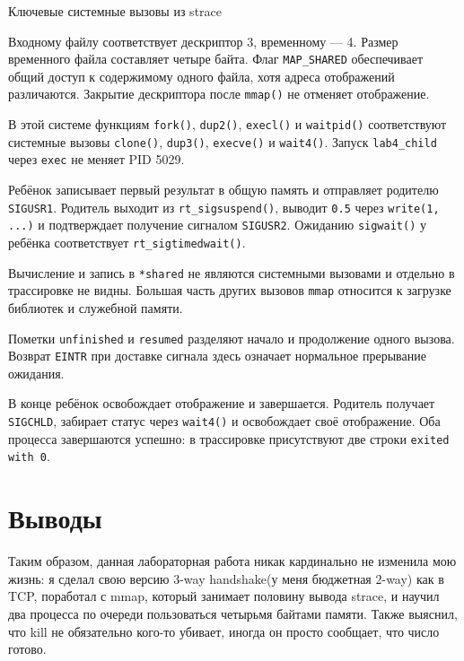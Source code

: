 \documentclass[12pt, a4paper]{article}
\begin{document}
\begin{listingblock}{Ключевые системные вызовы из strace}
\end{listingblock}

Входному файлу соответствует дескриптор 3, временному --- 4. Размер временного файла составляет четыре байта. Флаг \texttt{MAP\_SHARED} обеспечивает общий доступ к содержимому одного файла, хотя адреса отображений различаются. Закрытие дескриптора после \texttt{mmap()} не отменяет отображение.

В этой системе функциям \texttt{fork()}, \texttt{dup2()}, \texttt{execl()} и \texttt{waitpid()} соответствуют системные вызовы \texttt{clone()}, \texttt{dup3()}, \texttt{execve()} и \texttt{wait4()}. Запуск \texttt{lab4\_child} через \texttt{exec} не меняет PID 5029.

Ребёнок записывает первый результат в общую память и отправляет родителю \texttt{SIGUSR1}. Родитель выходит из \texttt{rt\_sigsuspend()}, выводит \texttt{0.5} через \texttt{write(1, ...)} и подтверждает получение сигналом \texttt{SIGUSR2}. Ожиданию \texttt{sigwait()} у ребёнка соответствует \texttt{rt\_sigtimedwait()}.

Вычисление и запись в \texttt{*shared} не являются системными вызовами и отдельно в трассировке не видны. Большая часть других вызовов \texttt{mmap} относится к загрузке библиотек и служебной памяти.

Пометки \texttt{unfinished} и \texttt{resumed} разделяют начало и продолжение одного вызова. Возврат \texttt{EINTR} при доставке сигнала здесь означает нормальное прерывание ожидания.

В конце ребёнок освобождает отображение и завершается. Родитель получает \texttt{SIGCHLD}, забирает статус через \texttt{wait4()} и освобождает своё отображение. Оба процесса завершаются успешно: в трассировке присутствуют две строки \texttt{exited with 0}.

\section{Выводы}

Таким образом, данная лабораторная работа никак кардинально не изменила мою жизнь: я сделал свою версию 3-way handshake(у меня бюджетная 2-way) как в TCP, поработал с mmap, который занимает половину вывода strace, и научил два процесса по очереди пользоваться четырьмя байтами памяти. Также выяснил, что kill не обязательно кого-то убивает, иногда он просто сообщает, что число готово.
\end{document}
